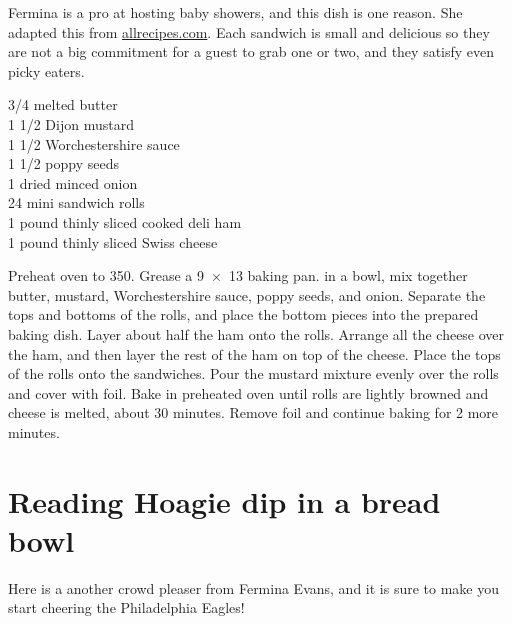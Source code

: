 \begin{open}
Fermina is a pro at hosting baby showers, and this dish is one reason. She adapted this from \url{allrecipes.com}. Each sandwich is small and delicious so they are not a big commitment for a guest to grab one or two, and they satisfy even picky eaters.
\end{open}
\begin{ingredients}
    \SI{3/4}{\cup} melted butter\\
    1 \SI{1/2}{\tblspoon} Dijon mustard\\
    1 \SI{1/2}{\teaspoon} Worchestershire sauce\\
    1 \SI{1/2}{\tblspoon} poppy seeds\\
    \SI{1}{\tblspoon} dried minced onion\\
    24 mini sandwich rolls\\
    1 pound thinly sliced cooked deli ham\\
    1 pound thinly sliced Swiss cheese\\
\end{ingredients}
Preheat oven to \SI{350}{\degreeF}. Grease a \SI{9x13}{\inch} baking pan. in a bowl, mix together butter, mustard, Worchestershire sauce, poppy seeds, and onion. Separate the tops and bottoms of the rolls, and place the bottom pieces into the prepared baking dish. Layer about half the ham onto the rolls. Arrange all the cheese over the ham, and then layer the rest of the ham on top of the cheese. Place the tops of the rolls onto the sandwiches. Pour the mustard mixture evenly over the rolls and cover with foil. Bake in preheated oven until rolls are lightly browned and cheese is melted, about 30 minutes. Remove foil and continue baking for 2 more minutes. 

\section{Reading Hoagie dip in a bread bowl}

\begin{open}
Here is a another crowd pleaser from Fermina Evans, and it is sure to make you start cheering the Philadelphia Eagles!
\end{open}

